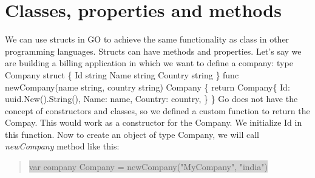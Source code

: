 \documentclass[12pt,a4paper]{report}
\begin{document}
\section*{Classes, properties and methods}
We can use structs in GO to achieve the same functionality as class in
other programming languages. Structs can have methods and properties.
Let's say we are building a billing application in which we want to define a company:
    type Company struct \{\newline
    \indent\indent Id      string\newline
    \indent\indent Name    string\newline
    \indent\indent Country string\newline
  \}\newline
  \newline
  func newCompany(name string, country string) Company \{
    \newline\indent return Company\{
      \newline\indent\indent Id:      uuid.New().String(),
      \newline\indent\indent Name:    name,
      \newline\indent\indent Country: country,
      \newline\indent\}
      \newline\}
  \newline\newline
Go does not have the concept of constructors and classes, so we defined a
custom function to return the Compay. This would work as a constructor
for the Company. We initialize Id in this function.
Now to create an object of type Company, we will call \textit{newCompany} method
like this:
\begin{quote}
  \colorbox{lightgray}{var company Company = newCompany("MyCompany", "india")}
\end{quote}
\end{document}
